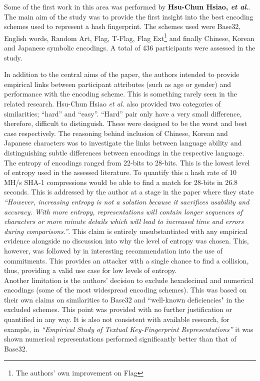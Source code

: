 Some of the first work in this area was performed by \textbf{Hsu-Chun Hsiao, \textit{et al.}}\cite{hsiao2009study}. The main aim of the study was to provide the first insight into the best encoding schemes used to represent a hash fingerprint. The schemes used were Base32, English words, Random Art\cite{perrig1999hash}, Flag\cite{ellison2003public}, T-Flag\cite{lin2010spate}, Flag Ext\footnote{The authors' own improvement on Flag} and finally Chinese, Korean and Japanese symbolic encodings. A total of 436 participants were assessed in the study.

In addition to the central aims of the paper, the authors intended to provide empirical links between participant attributes (such as age or gender) and performance with the encoding scheme. This is something rarely seen in the related research. Hsu-Chun Hsiao \textit{et al.} also provided two categories of similarities; ``hard'' and ``easy''. ``Hard'' pair only have a very small difference, therefore, difficult to distinguish. These were designed to be the worst and best case respectively. The reasoning behind inclusion of Chinese, Korean and Japanese characters was to investigate the links between language ability and distinguishing subtle differences between encodings in the respective language. The entropy of encodings ranged from 22-bits to 28-bits. This is the lowest level of entropy used in the assessed literature. To quantify this a hash rate of 10 MH/s SHA-1 compressions would be able to find a match for 28-bits in 26.8 seconds. This is addressed by the author at a stage in the paper where they state \textit{``However, increasing entropy is not a solution because it sacrifices usability and accuracy. With more entropy, representations will contain longer sequences of characters or more minute details which will lead to increased time and errors during comparisons.''}. This claim is entirely unsubstantiated with any empirical evidence alongside no discussion into why the level of entropy was chosen. This, however, was followed by in interesting recommendation into the use of commitments\cite{blum1982coin}. This provides an attacker with a single chance to find a collision, thus, providing a valid use case for low levels of entropy.\\
Another limitation is the authors' decision to exclude hexadecimal and numerical encodings (some of the most widespread encoding schemes). This was based on their own claims on similarities to Base32 and ``well-known deficiencies" in the excluded schemes. This point was provided with no further justification or quantified in any way. It is also not consistent with available research, for example, in \textit{``Empirical Study of Textual Key-Fingerprint Representations''}\cite{dechand2016empirical} it was shown numerical representations performed significantly better than that of Base32.

